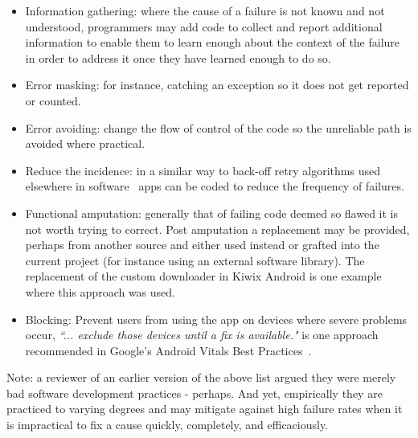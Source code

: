 \begin{itemize}
    \item Information gathering: where the cause of a failure is not known and not understood, programmers may add code to collect and report additional information to enable them to learn enough about the context of the failure in order to address it once they have learned enough to do so.
    \item Error masking: for instance, catching an exception so it does not get reported or counted.
    \item Error avoiding: change the flow of control of the code so the unreliable path is avoided where practical.
    \item Reduce the incidence: in a similar way to back-off retry algorithms used elsewhere in software~ apps can be coded to reduce the frequency of failures. 
    \item Functional amputation: generally that of failing code deemed so flawed it is not worth trying to correct. Post amputation a replacement may be provided, perhaps from another source and either used instead or grafted into the current project (for instance using an external software library). The replacement of the custom downloader in Kiwix Android is one example where this approach was used.
    \item Blocking: Prevent users from using the app on devices where severe problems occur, \emph{``... exclude those devices until a fix is available."} is one approach recommended in Google's Android Vitals Best Practices~.
\end{itemize}
\afterpage{\clearpage}

Note: a reviewer of an earlier version of the above list argued they were merely bad software development practices - perhaps. And yet, empirically they are practiced to varying degrees and may mitigate against high failure rates when it is impractical to fix a cause quickly, completely, and efficaciously.

